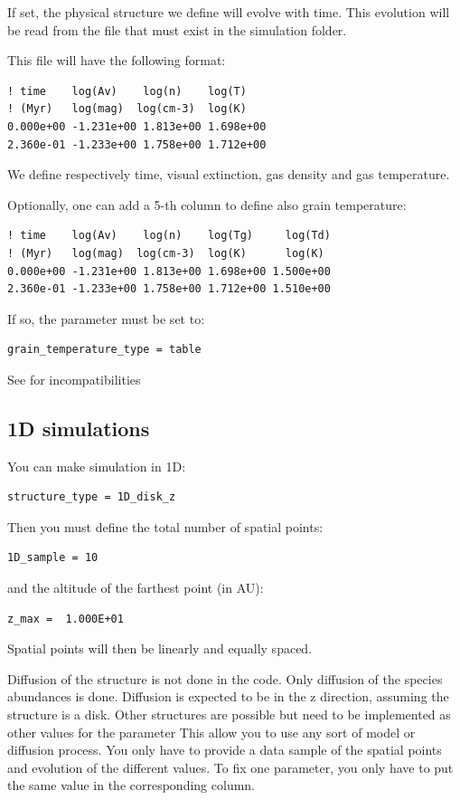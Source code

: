 \documentclass[english,a4paper,twoside]{article}
\begin{document}
If set, the physical structure we define will evolve with time. This evolution will be read from the file  that must exist in the simulation folder. 

This file will have the following format:
\begin{verbatim}
! time    log(Av)    log(n)    log(T)
! (Myr)   log(mag)  log(cm-3)  log(K)
0.000e+00 -1.231e+00 1.813e+00 1.698e+00
2.360e-01 -1.233e+00 1.758e+00 1.712e+00
\end{verbatim}
We define respectively time, visual extinction, gas density and gas temperature. 

Optionally, one can add a 5-th column to define also grain temperature:
\begin{verbatim}
! time    log(Av)    log(n)    log(Tg)     log(Td)
! (Myr)   log(mag)  log(cm-3)  log(K)      log(K)
0.000e+00 -1.231e+00 1.813e+00 1.698e+00 1.500e+00
2.360e-01 -1.233e+00 1.758e+00 1.712e+00 1.510e+00
\end{verbatim}
If so, the parameter  must be set to:
\begin{verbatim}
grain_temperature_type = table
\end{verbatim}

\begin{attention}
See  for incompatibilities
\end{attention}

\subsection{1D simulations}\label{sec:1D}
You can make simulation in 1D:
\begin{verbatim}
structure_type = 1D_disk_z
\end{verbatim}

Then you must define the total number of spatial points:
\begin{verbatim}
1D_sample = 10
\end{verbatim}
and the altitude of the farthest point (in AU):
\begin{verbatim}
z_max =  1.000E+01
\end{verbatim}

Spatial points will then be linearly and equally spaced. 

Diffusion of the structure is not done in the code. Only diffusion of the species abundances is done. Diffusion is expected to 
be in the z direction, assuming the structure is a disk. Other structures are possible but need to be implemented as other 
values for the parameter  This allow you to use any sort of model or diffusion 
process. You only have to provide a data sample of the spatial points and evolution of the different values. To fix one 
parameter, you only have to put the same value in the corresponding column.
\end{document}

